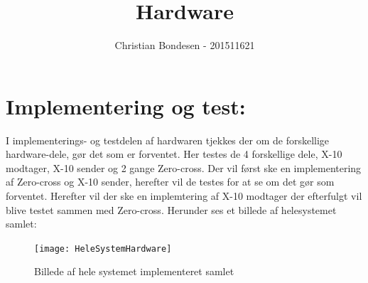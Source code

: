 \documentclass[11pt]{article}
\title{Hardware}
\author{Christian Bondesen - 201511621}
\begin{document}
\maketitle
\section{Implementering og test: }
I implementerings- og testdelen af hardwaren tjekkes der om de forskellige hardware-dele, gør det som er forventet. Her testes de 4 forskellige dele, X-10 modtager, X-10 sender og 2 gange Zero-cross. Der vil først ske en implementering af Zero-cross og X-10 sender, herefter vil de testes for at se om det gør som forventet. Herefter vil der ske en implemtering af X-10 modtager der efterfulgt vil blive testet sammen med Zero-cross. Herunder ses et billede af helesystemet samlet:
\begin{figure}[H]
\centering
\texttt{[image: HeleSystemHardware]}
\caption{Billede af hele systemet implementeret samlet}
\end{figure}
\end{document}
